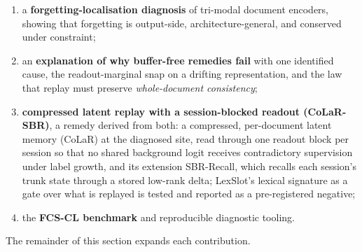 \begin{enumerate}
  \item a \textbf{forgetting-localisation diagnosis} of tri-modal document encoders, showing
        that forgetting is output-side, architecture-general, and conserved under constraint;
  \item an \textbf{explanation of why buffer-free remedies fail} with one identified cause, the
        readout-marginal snap on a drifting representation, and the law that replay must
        preserve \emph{whole-document consistency};
  \item \textbf{compressed latent replay with a session-blocked readout (CoLaR-SBR)}, a
        remedy derived from both: a compressed, per-document latent memory (CoLaR) at the
        diagnosed site, read through one readout block per session so that no shared
        background logit receives contradictory supervision under label growth, and its
        extension SBR-Recall, which recalls each session's trunk state through a stored
        low-rank delta; LexSlot's lexical signature as a gate over what is replayed is tested
        and reported as a pre-registered negative;
  \item the \textbf{FCS-CL benchmark} and reproducible diagnostic tooling.
\end{enumerate}

\noindent The remainder of this section expands each contribution.

